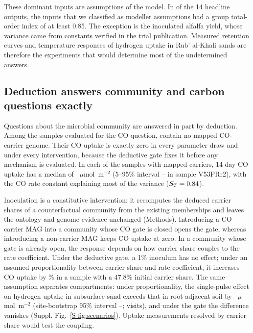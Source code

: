 \documentclass[11pt,a4paper]{article}
\begin{document}
These dominant inputs are assumptions of the model. In \UQHeadlinesAssumGeEightyFive{} of the 14 headline outputs, the inputs that we classified as modeller assumptions had a group total-order index of at least 0.85. The exception is the inoculated alfalfa yield, whose variance came from constants verified in the trial publication. Measured retention curves and temperature responses of hydrogen uptake in Rub' al-Khali sands are therefore the experiments that would determine most of the undetermined answers.

\subsection{Deduction answers community and carbon questions exactly}
Questions about the microbial community are answered in part by deduction. Among the samples evaluated for the CO question, \QMissingCOClosedSamples{} contain no mapped CO-carrier genome. Their CO uptake is exactly zero in every parameter draw and under every intervention, because the deductive gate fixes it before any mechanism is evaluated. In each of the \QMissingCOOpenSamples{} samples with mapped carriers, 14-day CO uptake has a median of \QMissingCOOpenMedian{}~$\mu$mol~m$^{-2}$ (5--95\% interval \QMissingCOOpenLow{}--\QMissingCOOpenHigh{} in sample V53PRr2), with the CO rate constant explaining most of the variance ($S_T=0.84$).

Inoculation is a constitutive intervention: it recomputes the deduced carrier shares of a counterfactual community from the existing memberships and leaves the ontology and genome evidence unchanged (Methods). Introducing a CO-carrier MAG into a community whose CO gate is closed opens the gate, whereas introducing a non-carrier MAG keeps CO uptake at zero. In a community whose gate is already open, the response depends on how carrier share couples to the rate coefficient. Under the deductive gate, a 1\% inoculum has no effect; under an assumed proportionality between carrier share and rate coefficient, it increases CO uptake by \QAddingOnePctMedian\% in a sample with a 47.8\% initial carrier share. The same assumption separates compartments: under proportionality, the single-pulse effect on hydrogen uptake in subsurface sand exceeds that in root-adjacent soil by \ContrastDeepRootEst{}~$\mu$mol~m$^{-2}$ (site-bootstrap 95\% interval \ContrastDeepRootLow{}--\ContrastDeepRootHigh{}; \ContrastDeepRootVisits{} visits), and under the gate the difference vanishes (Suppl. Fig.~\ref{S-fig:scenarios}). Uptake measurements resolved by carrier share would test the coupling.
\end{document}
